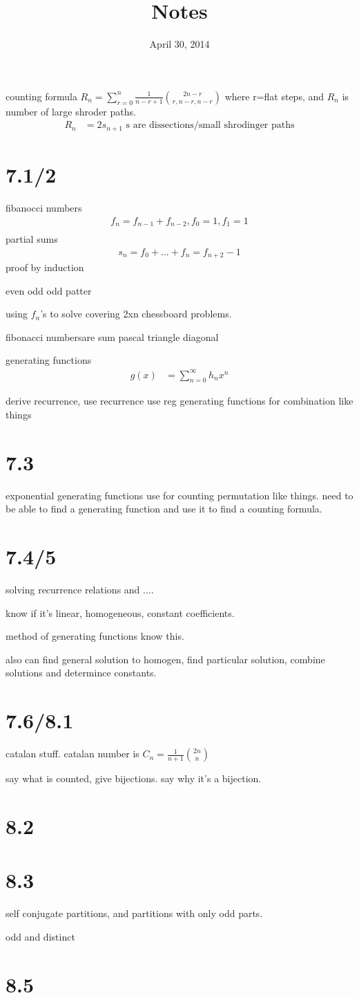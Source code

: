 \documentclass{article}
\begin{document}
\title{Notes}
\date{April 30, 2014}
\maketitle
counting formula $R_n=\sum\limits_{r=0}^n{\frac{1}{n-r+1}\binom{2n-r}{r,n-r,n-r}}$ where r=flat steps, and $R_n$ is number of large shroder paths.
\begin{align*}
  R_n&=2s_{n+1}\text{ s are dissections/small shrodinger paths}
\end{align*}
\section*{7.1/2}
fibanocci numbers
\begin{align*}
  f_n=f_{n-1}+f_{n-2},f_0=1,f_1=1\\
\end{align*}
partial sums
\begin{align*}
  s_n=f_0+\dots+f_n=f_{n+2}-1
\end{align*}
proof by induction

even odd odd patter

using $f_n$'s to solve covering 2xn chessboard problems.

fibonacci numbersare sum pascal triangle diagonal

generating functions
\begin{align*}
  g(x)&=\sum\limits_{n=0}^\infty{h_nx^n}
\end{align*}

derive recurrence, use recurrence
use reg generating functions for combination like things
\section*{7.3}
exponential generating functions
use for counting permutation like things.
need to be able to find a generating function and use it to find a counting formula.
\section*{7.4/5}
solving recurrence relations and ....

know if it's linear, homogeneous, constant coefficients.

method of generating functions know this.

also can find general solution to homogen, find particular solution, combine solutions and determince constants.
\section*{7.6/8.1}
catalan stuff.
catalan number is $C_n=\frac{1}{n+1}\binom{2n}{n}$

say what is counted, give bijections. say why it's a bijection.
\section*{8.2}

\section*{8.3}
self conjugate partitions, and partitions with only odd parts.

odd and distinct
\section*{8.5}
\end{document}

